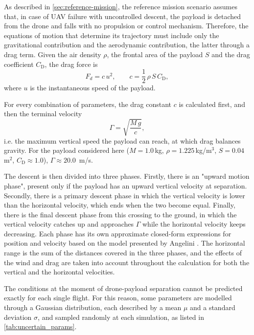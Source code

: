 As described in \cref{sec:reference-mission}, the reference mission scenario assumes that, in case of UAV failure with uncontrolled descent, the payload is detached from the drone and falls with no propulsion or control mechanism. Therefore, the equations of motion that determine its trajectory must include only the gravitational contribution and the aerodynamic contribution, the latter through a drag term. Given the air density $\rho$, the frontal area of the payload $S$ and the drag coefficient $C_\text{D}$, the drag force is
\begin{equation}
  F_d = c\,u^2, \qquad c = \frac{1}{2}\,\rho\,S\,C_\text{D} ,
  \label{eq:drag}
\end{equation}
where $u$ is the instantaneous speed of the payload.

For every combination of parameters, the drag constant $c$ is calculated first, and then the terminal velocity
\begin{equation}
  \Gamma = \sqrt{\frac{M\,g}{c}} ,
  \label{eq:terminal_velocity}
\end{equation}
i.e. the maximum vertical speed the payload can reach, at which drag balances gravity. For the payload considered here ($M = 1.0$\,kg, $\rho=1.225$\,kg/m$^3$, $S = 0.04$\,m$^2$, $C_\text{D} \approx 1.0$), $\Gamma \approx 20.0$~m/s.


The descent is then divided into three phases. Firstly, there is an "upward motion phase", present only if the payload has an upward vertical velocity at separation. Secondly, there is a primary descent phase in which the vertical velocity is lower than the horizontal velocity, which ends when the two become equal. Finally, there is the final descent phase from this crossing to the ground, in which the vertical velocity catches up and approaches $\Gamma$ while the horizontal velocity keeps decreasing. Each phase has its own approximate closed-form expressions for position and velocity based on the model presented by Angelini \cite{Angelini2023}. The horizontal range is the sum of the distances covered in the three phases, and the effects of the wind and drag are taken into account throughout the calculation for both the vertical and the horizontal velocities.

The conditions at the moment of drone-payload separation cannot be predicted exactly for each single flight. For this reason, some parameters are modelled through a Gaussian distribution, each described by a mean $\mu$ and a standard deviation $\sigma$, and sampled randomly at each simulation, as listed in \cref{tab:uncertain_params}.

